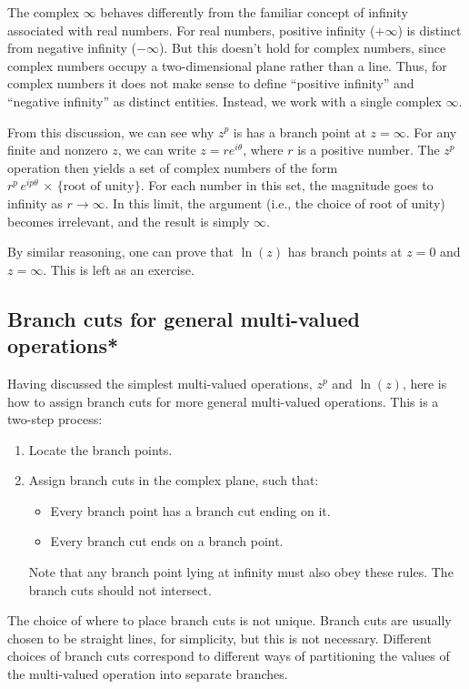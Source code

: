 \documentclass[10pt,a4paper]{article}
\begin{document}
The complex $\infty$ behaves differently from the familiar concept of
infinity associated with real numbers. For real numbers, positive
infinity ($+\infty$) is distinct from negative infinity
($-\infty$). But this doesn't hold for complex numbers, since complex
numbers occupy a two-dimensional plane rather than a line. Thus, for
complex numbers it does not make sense to define ``positive infinity''
and ``negative infinity'' as distinct entities. Instead, we work with
a single complex $\infty$.

From this discussion, we can see why $z^p$ is has a branch point at $z
= \infty$. For any finite and nonzero $z$, we can write $z =
re^{i\theta}$, where $r$ is a positive number. The $z^p$ operation
then yields a set of complex numbers of the form $r^p \,
e^{ip\theta}\,\times\, \{\text{root of unity}\}$.  For each number in
this set, the magnitude goes to infinity as $r \rightarrow \infty$. In
this limit, the argument (i.e., the choice of root of unity) becomes
irrelevant, and the result is simply $\infty$.

By similar reasoning, one can prove that $\ln(z)$ has branch points at
$z = 0$ and $z = \infty$.  This is left as an exercise.

\subsection{Branch cuts for general multi-valued operations*}
\label{branch-cuts-for-general-multi-valued-operations}

Having discussed the simplest multi-valued operations, $z^p$ and
$\ln(z)$, here is how to assign branch cuts for more general
multi-valued operations. This is a two-step process:

\begin{enumerate}
\item
Locate the branch points.

\item Assign branch cuts in the complex plane, such that:
  \begin{itemize}
  \item Every branch point has a branch cut ending on it.
  \item Every branch cut ends on a branch point.
  \end{itemize}
  Note that any branch point lying at infinity must also obey these
  rules.  The branch cuts should not intersect.
\end{enumerate}

\noindent
The choice of where to place branch cuts is not unique. Branch cuts are
usually chosen to be straight lines, for simplicity, but this is not
necessary. Different choices of branch cuts correspond to different ways
of partitioning the values of the multi-valued operation into separate
branches.
\end{document}
